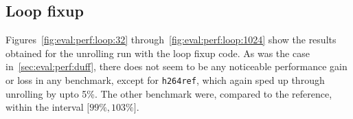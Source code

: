 \subsection{Loop fixup}\label{sec:eval:perf:loop}

Figures~\ref{fig:eval:perf:loop:32} through~\ref{fig:eval:perf:loop:1024} show the results obtained for the unrolling run with the loop fixup code.
As was the case in~\cref{sec:eval:perf:duff}, there does not seem to be any noticeable performance gain or loss in any benchmark, except for \texttt{h264ref}, which again sped up through unrolling by upto 5\%.
The other benchmark were, compared to the reference, within the interval $\lbrack 99\%, 103\% \rbrack$.




